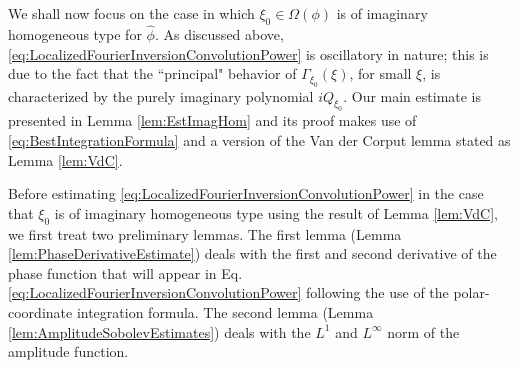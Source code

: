 \documentclass[11pt, letter]{book}
\newtheorem{proposition}[theorem]{Proposition}
\begin{document}
\noindent We shall now focus on the case in which $\xi_0\in\Omega(\phi)$ is of imaginary homogeneous type for $\widehat{\phi}$. As discussed above,  \eqref{eq:LocalizedFourierInversionConvolutionPower} is oscillatory in nature; this is due to the fact that the ``principal" behavior of $\Gamma_{\xi_0}(\xi)$, for small $\xi$, is characterized by the purely imaginary polynomial $iQ_{\xi_0}$. Our main estimate is presented in Lemma \ref{lem:EstImagHom} and its proof makes use of \eqref{eq:BestIntegrationFormula} and a version of the Van der Corput lemma stated as Lemma \ref{lem:VdC}.






\noindent Before estimating \eqref{eq:LocalizedFourierInversionConvolutionPower} in the case that $\xi_0$ is of imaginary homogeneous type using the result of Lemma \ref{lem:VdC}, we first treat two preliminary lemmas. The first lemma (Lemma \ref{lem:PhaseDerivativeEstimate}) deals with the first and second derivative of the phase function that will appear in Eq. \eqref{eq:LocalizedFourierInversionConvolutionPower} following the use of the polar-coordinate integration formula. The second lemma (Lemma \ref{lem:AmplitudeSobolevEstimates}) deals with the $L^1$ and $L^\infty$ norm of the amplitude function. 
\end{document}
